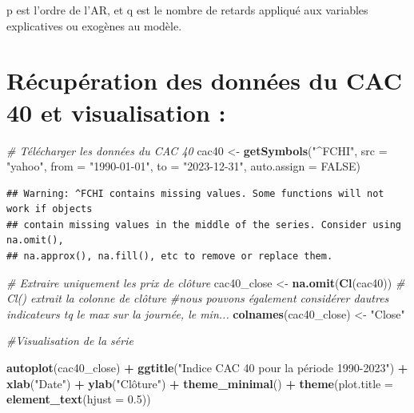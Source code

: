 \documentclass[
]{article}
\newenvironment{Shaded}{\begin{snugshade}}{\end{snugshade}}
\newcommand{\AttributeTok}[1]{\textcolor[rgb]{0.13,0.29,0.53}{#1}}
\newcommand{\CommentTok}[1]{\textcolor[rgb]{0.56,0.35,0.01}{\textit{#1}}}
\newcommand{\ConstantTok}[1]{\textcolor[rgb]{0.56,0.35,0.01}{#1}}
\newcommand{\FloatTok}[1]{\textcolor[rgb]{0.00,0.00,0.81}{#1}}
\newcommand{\FunctionTok}[1]{\textcolor[rgb]{0.13,0.29,0.53}{\textbf{#1}}}
\newcommand{\NormalTok}[1]{#1}
\newcommand{\OtherTok}[1]{\textcolor[rgb]{0.56,0.35,0.01}{#1}}
\newcommand{\SpecialCharTok}[1]{\textcolor[rgb]{0.81,0.36,0.00}{\textbf{#1}}}
\newcommand{\StringTok}[1]{\textcolor[rgb]{0.31,0.60,0.02}{#1}}
\begin{document}
p est l'ordre de l'AR, et q est le nombre de retards appliqué aux
variables explicatives ou exogènes au modèle.

\hypertarget{ruxe9cupuxe9ration-des-donnuxe9es-du-cac-40-et-visualisation}{%
\section{Récupération des données du CAC 40 et visualisation
:}\label{ruxe9cupuxe9ration-des-donnuxe9es-du-cac-40-et-visualisation}}

\begin{Shaded}
\begin{Highlighting}[]
\CommentTok{\# Télécharger les données du CAC 40}
\NormalTok{cac40 }\OtherTok{\textless{}{-}} \FunctionTok{getSymbols}\NormalTok{(}\StringTok{"\^{}FCHI"}\NormalTok{, }\AttributeTok{src =} \StringTok{"yahoo"}\NormalTok{, }\AttributeTok{from =} \StringTok{"1990{-}01{-}01"}\NormalTok{, }\AttributeTok{to =} \StringTok{"2023{-}12{-}31"}\NormalTok{, }\AttributeTok{auto.assign =} \ConstantTok{FALSE}\NormalTok{)}
\end{Highlighting}
\end{Shaded}

\begin{verbatim}
## Warning: ^FCHI contains missing values. Some functions will not work if objects
## contain missing values in the middle of the series. Consider using na.omit(),
## na.approx(), na.fill(), etc to remove or replace them.
\end{verbatim}

\begin{Shaded}
\begin{Highlighting}[]
\CommentTok{\# Extraire uniquement les prix de clôture}
\NormalTok{cac40\_close }\OtherTok{\textless{}{-}} \FunctionTok{na.omit}\NormalTok{(}\FunctionTok{Cl}\NormalTok{(cac40))  }\CommentTok{\# \textquotesingle{}Cl()\textquotesingle{} extrait la colonne de clôture}
\CommentTok{\#nous pouvons également considérer d\textquotesingle{}autres indicateurs tq le max sur la journée, le min...}
\FunctionTok{colnames}\NormalTok{(cac40\_close) }\OtherTok{\textless{}{-}} \StringTok{"Close"}

\CommentTok{\#Visualisation de la série }

\FunctionTok{autoplot}\NormalTok{(cac40\_close) }\SpecialCharTok{+}
  \FunctionTok{ggtitle}\NormalTok{(}\StringTok{"Indice CAC 40 pour la période 1990{-}2023"}\NormalTok{) }\SpecialCharTok{+}
  \FunctionTok{xlab}\NormalTok{(}\StringTok{"Date"}\NormalTok{) }\SpecialCharTok{+}
  \FunctionTok{ylab}\NormalTok{(}\StringTok{"Clôture"}\NormalTok{) }\SpecialCharTok{+}
  \FunctionTok{theme\_minimal}\NormalTok{() }\SpecialCharTok{+} 
  \FunctionTok{theme}\NormalTok{(}\AttributeTok{plot.title =} \FunctionTok{element\_text}\NormalTok{(}\AttributeTok{hjust =} \FloatTok{0.5}\NormalTok{)) }
\end{Highlighting}
\end{Shaded}
\end{document}
